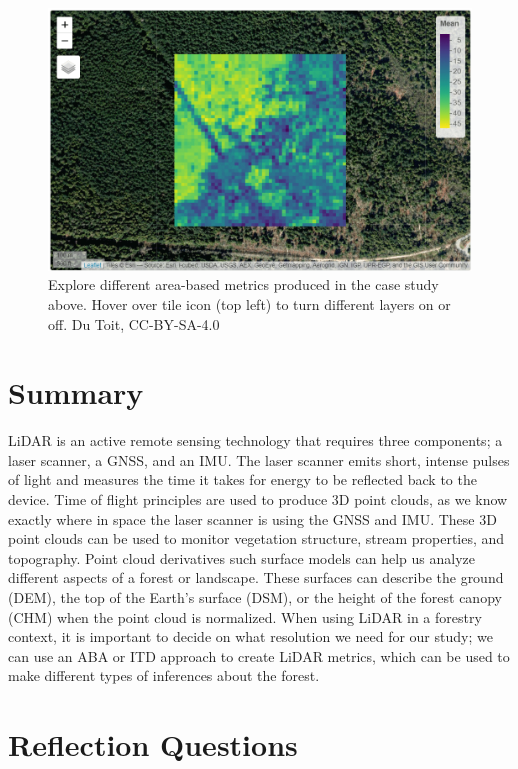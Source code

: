 \documentclass[
]{book}
\begin{document}
\begin{figure}
\includegraphics[width=14.03in]{images/15-map} \caption{Explore different area-based metrics produced in the case study above. Hover over tile icon (top left) to turn different layers on or off. Du Toit, CC-BY-SA-4.0}\label{fig:15-map}
\end{figure}

\section{Summary}\label{summary-5}

LiDAR is an active remote sensing technology that requires three components; a laser scanner, a GNSS, and an IMU. The laser scanner emits short, intense pulses of light and measures the time it takes for energy to be reflected back to the device. Time of flight principles are used to produce 3D point clouds, as we know exactly where in space the laser scanner is using the GNSS and IMU. These 3D point clouds can be used to monitor vegetation structure, stream properties, and topography. Point cloud derivatives such surface models can help us analyze different aspects of a forest or landscape. These surfaces can describe the ground (DEM), the top of the Earth's surface (DSM), or the height of the forest canopy (CHM) when the point cloud is normalized. When using LiDAR in a forestry context, it is important to decide on what resolution we need for our study; we can use an ABA or ITD approach to create LiDAR metrics, which can be used to make different types of inferences about the forest.

\section*{Reflection Questions}\label{reflection-questions-10}
\end{document}
